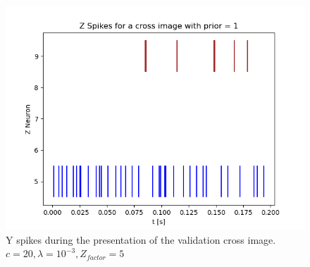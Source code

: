 \begin{figure}
  \includegraphics[width=\linewidth]{figures/horvert/horvert_c20_3_Zfactor5_crossZSpikes.png}
  \caption{Y spikes during the presentation of the validation cross image. $c = 20, \lambda = 10^{-3}, Z_{factor} = 5$}
  \label{fig:horvert_c20_3_Zfactor5_crossZSpikes}
\end{figure}

















